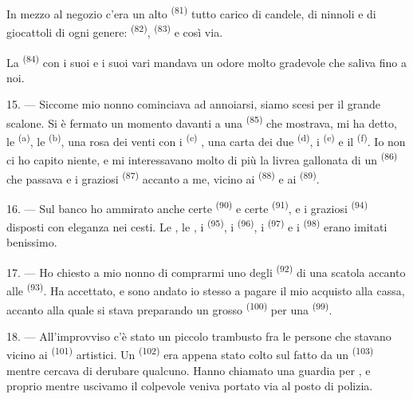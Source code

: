 In mezzo al negozio c'era un alto  \textsuperscript{(81)}
tutto carico di candele, di ninnoli e di giocattoli di ogni genere:
 \textsuperscript{(82)}, 
\textsuperscript{(83)} e così via.

La  \textsuperscript{(84)} con i suoi  e i suoi
vari  mandava un odore molto gradevole che saliva fino a noi.

\VUsaut{3.4mm}
\VUsaut{2.8mm}

15. --- Siccome mio nonno cominciava ad annoiarsi, siamo scesi per il grande scalone.
Si è fermato un momento davanti a una 
\textsuperscript{(85)} che mostrava, mi ha detto, le 
\textsuperscript{(a)}, le  \textsuperscript{(b)}, una
rosa dei venti con i  \textsuperscript{(c)}
, una carta dei due 
\textsuperscript{(d)}, i  \textsuperscript{(e)} e il
 \textsuperscript{(f)}. Io non ci ho capito niente, e mi
interessavano molto di più la livrea gallonata di un 
\textsuperscript{(86)} che passava e i graziosi 
\textsuperscript{(87)} accanto a me, vicino ai 
\textsuperscript{(88)} e ai  \textsuperscript{(89)}.

16. --- Sul banco ho ammirato anche certe  \textsuperscript{(90)} e certe
 \textsuperscript{(91)}, e i graziosi 
\textsuperscript{(94)} disposti con eleganza nei cesti. Le , le
, i  \textsuperscript{(95)}, i
 \textsuperscript{(96)}, i  \textsuperscript{(97)} e i
 \textsuperscript{(98)} erano imitati benissimo.

\VUsaut{4.4mm}
\VUsaut{2.8mm}

17. --- Ho chiesto a mio nonno di comprarmi uno degli 
\textsuperscript{(92)} di una scatola accanto alle 
\textsuperscript{(93)}. Ha accettato, e sono andato io stesso a pagare il mio acquisto
alla cassa, accanto alla quale si stava preparando un grosso 
\textsuperscript{(100)} per una  \textsuperscript{(99)}.

18. --- All'improvviso c'è stato un piccolo trambusto fra le persone che stavano vicino
ai  \textsuperscript{(101)} artistici. Un 
\textsuperscript{(102)} era appena stato colto sul fatto da un
 \textsuperscript{(103)} mentre cercava di derubare
qualcuno. Hanno chiamato una guardia per , e proprio mentre
uscivamo il colpevole veniva portato via al posto di polizia.
\VUsaut{6.0mm}
\VUfilet{22mm}
